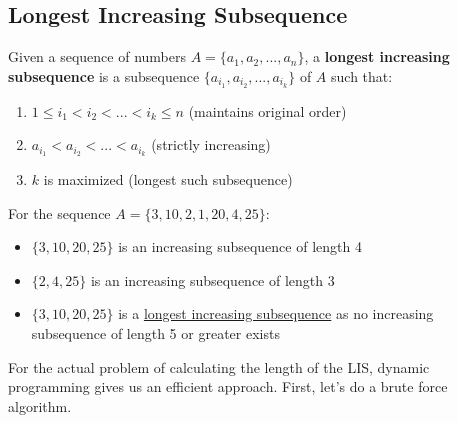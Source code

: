 \subsection{Longest Increasing Subsequence}

  \begin{definition}
    \label{def:longest-increasing-subsequence}
    Given a sequence of numbers $A = \{a_1, a_2, ..., a_n\}$, a \textbf{longest increasing subsequence} is a subsequence $\{a_{i_1}, a_{i_2}, ..., a_{i_k}\}$ of $A$ such that:
    \begin{enumerate}
      \item $1 \leq i_1 < i_2 < ... < i_k \leq n$ (maintains original order)
      \item $a_{i_1} < a_{i_2} < ... < a_{i_k}$ (strictly increasing)
      \item $k$ is maximized (longest such subsequence)
    \end{enumerate}
  \end{definition}

  \begin{example}
    \label{ex:sequence-increasing-subsequence-length}
    For the sequence $A = \{3, 10, 2, 1, 20, 4, 25\}$:
    \begin{itemize}
      \item $\{3, 10, 20, 25\}$ is an increasing subsequence of length 4
      \item $\{2, 4, 25\}$ is an increasing subsequence of length 3
      \item $\{3, 10, 20, 25\}$ is a \hyperref[def:longest-increasing-subsequence]{longest increasing subsequence} as no increasing subsequence of length 5 or greater exists
    \end{itemize}
  \end{example}

  For the actual problem of calculating the length of the LIS, dynamic programming gives us an efficient approach. First, let's do a brute force algorithm. 

